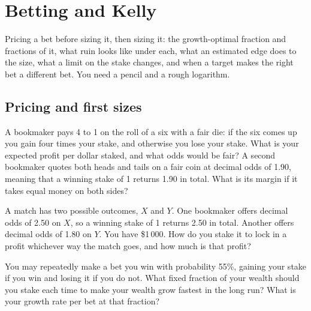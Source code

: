 \chapter{Betting and Kelly}\label{ch:iv2:betting-and-kelly}

\begin{ivtrains}
Pricing a bet before sizing it, then sizing it: the growth-optimal fraction and fractions of it, what ruin looks like under each, what an estimated edge does to the size, what a limit on the stake changes, and when a target makes the right bet a different bet. You need a pencil and a rough logarithm.
\end{ivtrains}

\section{Pricing and first sizes}

\begin{question}\label{iq:iv2:betting-and-kelly:1}
A bookmaker pays 4 to 1 on the roll of a six with a fair die: if the six comes up you gain four times your stake, and otherwise you lose your stake. What is your expected profit per dollar staked, and what odds would be fair? A second bookmaker quotes both heads and tails on a fair coin at decimal odds of 1.90, meaning that a winning stake of 1 returns 1.90 in total. What is its margin if it takes equal money on both sides?
\end{question}

\begin{question}\label{iq:iv2:betting-and-kelly:2}
A match has two possible outcomes, $X$ and $Y$. One bookmaker offers decimal odds of 2.50 on $X$, so a winning stake of 1 returns 2.50 in total. Another offers decimal odds of 1.80 on $Y$. You have \$1\,000. How do you stake it to lock in a profit whichever way the match goes, and how much is that profit?
\end{question}

\begin{question}\label{iq:iv2:betting-and-kelly:3}
You may repeatedly make a bet you win with probability 55\%, gaining your stake if you win and losing it if you do not. What fixed fraction of your wealth should you stake each time to make your wealth grow fastest in the long run? What is your growth rate per bet at that fraction?
\end{question}

